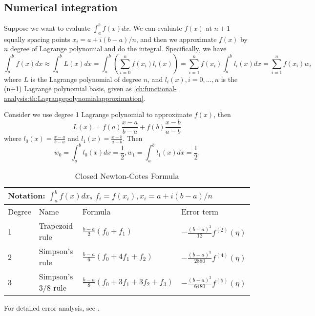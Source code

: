 \begin{refsection}
\section{Numerical integration}
\begin{definition}
Suppose we want to evaluate $\int_a^b f(x)dx$. We can evaluate $f(x)$ at $n+1$ equally spacing points $x_i = a + i(b-a)/n$, and then we approximate $f(x)$ by $n$ degree of Lagrange polynomial and do the integral. Specifically, we have
	$$\int_a^b f(x)dx \approx \int_a^b L(x)dx = \int_a^b (\sum_{i=0}^n f(x_i)l_i(x)) = \sum_{i=1}^n f(x_i)\int_a^b l_i(x)dx = \sum_{i=1}^n f(x_i)w_i$$
where $L$ is the Lagrange polynomial of degree $n$, and $l_i(x),i=0,...,n$ is the (n+1) Lagrange polynomial basis, given as \autoref{ch:functional-analysis:th:Lagrangepolynomialapproximation}.
\end{definition}

\begin{example}
Consider we use degree 1 Lagrange polynomial to approximate $f(x)$, then
$$L(x) = f(a)\frac{x-a}{b-a} + f(b)\frac{x-b}{a-b}$$
where $l_0(x) = \frac{x-a}{b-a}$ and $l_1(x) = \frac{x-b}{a-b}$. Then
$$w_0 = \int_a^b l_0(x)dx = \frac{1}{2},w_1 = \int_a^b l_1(x)dx=\frac{1}{2}.$$	
\end{example}




\begin{table}[H]
	\centering
	\caption{Closed Newton-Cotes Formula}
	\label{integral}
	\begin{tabular}{|l|l|l|l|}
	\hline
		\multicolumn{4}{|l|}{Notation:	$\int_a^b f(x)dx$, $f_i = f(x_i), x_i = a + i(b-a)/n$} \\ \hline
Degree	&  Name   &  Formula   &  Error term   \\ \hline
	1	&  Trapezoid rule   &  $\frac{b-a}{2}(f_0 + f_1)$   &  $-\frac{(b-a)^3}{12}f^{(2)}(\eta)$   \\ \hline
	2	&  Simpson's rule   & $\frac{b-a}{6}(f_0 + 4f_1 +  f_2)$    &   $-\frac{(b-a)^5}{2880}f^{(4)}(\eta)$   \\ \hline
	3	&  Simpson's 3/8 rule   &  $\frac{b-a}{8}(f_0 + 3f_1 + 3f_2 + f_3)$   &   $-\frac{(b-a)^3}{6480}f^{(5)}(\eta)$   \\ \hline
	\end{tabular}
\end{table}

\begin{remark}
For detailed error analysis, see \cite[252]{atkinson1989introduction}.
\end{remark}


\end{refsection}
